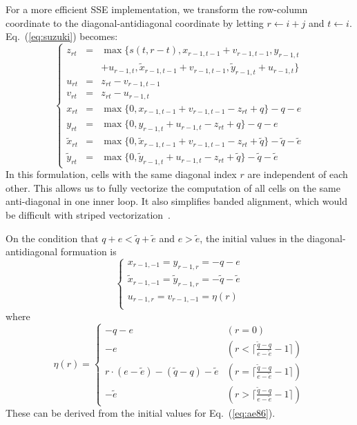 \documentclass{bioinfo}
\begin{document}
\begin{methods}
For a more efficient SSE implementation, we transform the row-column coordinate
to the diagonal-antidiagonal coordinate by letting $r\gets i+j$ and $t\gets i$.
Eq.~(\ref{eq:suzuki}) becomes:
\begin{equation*}
\left\{\begin{array}{lll}
z_{rt}&=&\max\{s(t,r-t),x_{r-1,t-1}+v_{r-1,t-1},y_{r-1,t}\\
&&+u_{r-1,t},\tilde{x}_{r-1,t-1}+v_{r-1,t-1},\tilde{y}_{r-1,t}+u_{r-1,t}\}\\
u_{rt}&=&z_{rt}-v_{r-1,t-1}\\
v_{rt}&=&z_{rt}-u_{r-1,t}\\
x_{rt}&=&\max\{0,x_{r-1,t-1}+v_{r-1,t-1}-z_{rt}+q\}-q-e\\
y_{rt}&=&\max\{0,y_{r-1,t}+u_{r-1,t}-z_{rt}+q\}-q-e\\
\tilde{x}_{rt}&=&\max\{0,\tilde{x}_{r-1,t-1}+v_{r-1,t-1}-z_{rt}+\tilde{q}\}-\tilde{q}-\tilde{e}\\
\tilde{y}_{rt}&=&\max\{0,\tilde{y}_{r-1,t}+u_{r-1,t}-z_{rt}+\tilde{q}\}-\tilde{q}-\tilde{e}
\end{array}\right.
\end{equation*}
In this formulation, cells with the same diagonal index $r$ are independent of
each other. This allows us to fully vectorize the computation of all cells on
the same anti-diagonal in one inner loop. It also simplifies banded alignment,
which would be difficult with striped vectorization~\citep{Farrar:2007hs}.

On the condition that $q+e<\tilde{q}+\tilde{e}$ and $e>\tilde{e}$, the initial
values in the diagonal-antidiagonal formuation is
\[
\left\{\begin{array}{l}
x_{r-1,-1}=y_{r-1,r}=-q-e\\
\tilde{x}_{r-1,-1}=\tilde{y}_{r-1,r}=-\tilde{q}-\tilde{e}\\
u_{r-1,r}=v_{r-1,-1}=\eta(r)\\
\end{array}\right.
\]
where
\[
\eta(r)=\left\{\begin{array}{ll}
-q-e & (r=0) \\
-e & (r<\lceil\frac{\tilde{q}-q}{e-\tilde{e}}-1\rceil) \\
r\cdot(e-\tilde{e})-(\tilde{q}-q)-\tilde{e} & (r=\lceil\frac{\tilde{q}-q}{e-\tilde{e}}-1\rceil) \\
-\tilde{e} & (r>\lceil\frac{\tilde{q}-q}{e-\tilde{e}}-1\rceil)
\end{array}\right.
\]
These can be derived from the initial values for Eq.~(\ref{eq:ae86}).


\end{methods}
\end{document}
